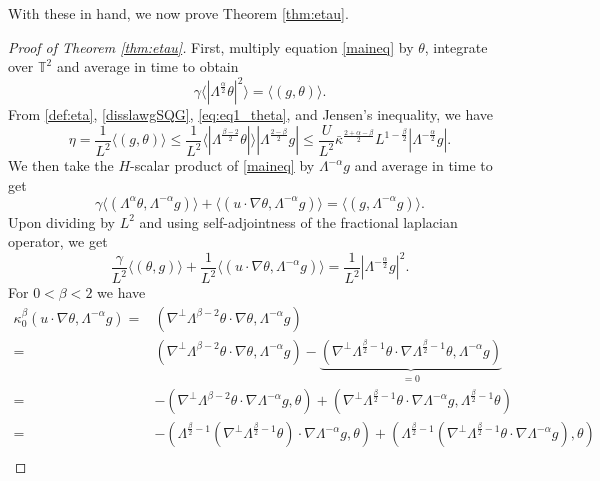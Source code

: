 \documentclass[twoside, reqno]{amsart}
\numberwithin{lemma}{section}
\numberwithin{theorem}{section}
\numberwithin{proposition}{section}
\numberwithin{equation}{section} %
\newcommand{\te}{\theta}
\newcommand{\ga}{\gamma}
\newcommand{\la}{\Lambda}
\newcommand{\ka}{\kappa}
\newcommand{\lbn}{\left (}
\newcommand{\rbn}{\right )}
\newcommand{\al}{\alpha}
\newcommand{\be}{\beta}
\begin{document}
With these in hand, we now prove Theorem \ref{thm:etau}. 
\begin{proof}[Proof of Theorem \ref{thm:etau}]
    First, multiply equation \eqref{maineq} by $\te$, integrate over $\mathbb{T}^2$ and average in time to obtain
    \begin{equation} \label{eq:eq1_theta}
        \ga \langle |\la^{\frac{\alpha}{2}}\te|^2 \rangle = \langle (g, \te) \rangle .   
    \end{equation}
    From \eqref{def:eta}, \eqref{disslawgSQG}, \eqref{eq:eq1_theta}, and  Jensen's inequality, we have
    \begin{equation} \label{ineq:etaineq}
        \eta = \frac{1}{L^2} \langle (g, \te) \rangle \le \frac{1}{L^2} \langle|\la^{\frac{\beta-2}{2}}\te|\rangle |\la^{\frac{2-\beta}{2}}g| 
        \le \frac{U}{L^2} \bar{\ka}^{\frac{2+\alpha-\beta}{2}}{L^{1-\frac{\beta}{2}}} |\la^{-\frac{\alpha}{2}}g| .
    \end{equation}
    We then take the {$H$-scalar} product of \eqref{maineq} by $\la^{-\alpha}g$ and average in time to get
    \begin{equation*} 
     \ga \langle (\la^{\alpha}\te, \la^{-\alpha}g) \rangle + \langle (u\cdotp\nabla \te, \la^{-\alpha}g) \rangle = \langle (g, \la^{-\alpha}g) \rangle .
    \end{equation*}
Upon dividing by $L^2$ and {using self-adjointness of} the fractional laplacian operator, we get
    \begin{equation} \label{eq:eq1_la_nalpha_g}
        \frac{\ga}{L^2} \langle (\te,g) \rangle + \frac{1}{L^2}\langle (u\cdotp\nabla \te, \la^{-\alpha}g) \rangle  = \frac{1}{L^2} |\la^{-\frac{\alpha}{2}} g|^2  .
    \end{equation}
For $0<\be<2$ we have
\begin{align*}
    \ka_0^\be\lbn u\cdot \nabla \te, \la^{-\alpha}g \rbn=&\lbn \nabla^{\perp}\la^{\beta-2}\te\cdot \nabla \te, \la^{-\alpha}g \rbn\\
    =&\lbn \nabla^{\perp}\la^{\beta-2}\te\cdot \nabla \te, \la^{-\alpha}g \rbn-\underbrace{\lbn \nabla^{\perp}\la^{\frac{\beta}{2}-1}\te\cdot \nabla \la^{\frac{\beta}{2}-1}\te,\la^{-\alpha}g \rbn}_{=0}\\
    =&-\lbn \nabla^{\perp}\la^{\be-2}\te\cdot \nabla\la^{-\al}g,\te\rbn+\lbn \nabla^{\perp}\la^{\frac{\be}{2}-1}\te \cdot \nabla \la^{-\al}g,\la^{\frac{\be}{2}-1}\te \rbn\\
    =&-\lbn \la^{\frac{\be}{2}-1}(\nabla^{\perp}\la^{\frac{\be}{2}-1}\te)\cdot \nabla \la^{-\al}g,\te\rbn+\lbn \la^{\frac{\be}{2}-1}(\nabla^{\perp}\la^{\frac{\be}{2}-1}\te\cdot \nabla \la^{-\al}g),\te\rbn\\

\end{align*}
\end{proof}
\end{document}
